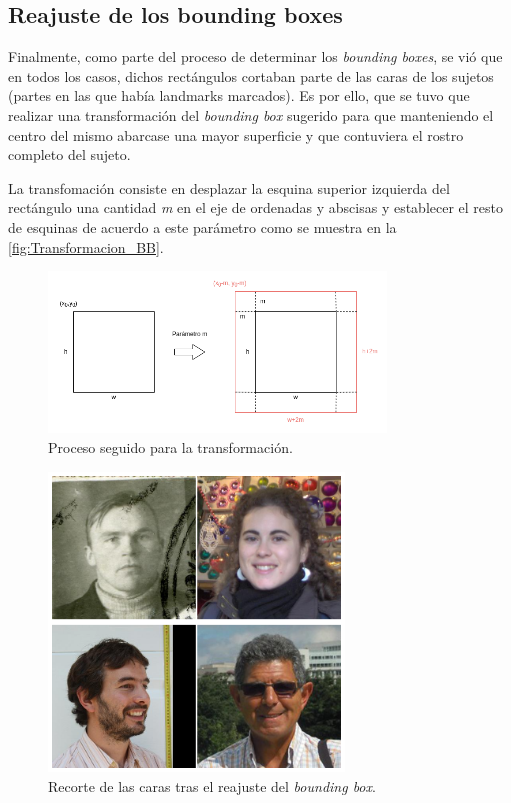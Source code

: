         \subsection{Reajuste de los bounding boxes}
            \noindent Finalmente, como parte del proceso de determinar los \textit{bounding boxes}, se vió que en todos los casos, dichos rectángulos cortaban parte de las caras de los sujetos (partes en las que había landmarks marcados). Es por ello, que se tuvo que realizar una transformación del \textit{bounding box} sugerido para que manteniendo el centro del mismo abarcase una mayor superficie y que contuviera el rostro completo del sujeto. 

            \medskip

            \noindent La transfomación consiste en desplazar la esquina superior izquierda del rectángulo una cantidad \textit{m} en el eje de ordenadas y abscisas y establecer el resto de esquinas de acuerdo a este parámetro como se muestra en la \autoref{fig:Transformacion_BB}.


            \begin{figure}[!h]
                \centering
                \includegraphics[width=0.8\textwidth]{img/Transformacion_rectangulo.png}
                \caption{Proceso seguido para la transformación.}
                \label{fig:Transformacion_BB}
            \end{figure}

            \begin{figure}[!h]
                \centering
                \includegraphics[width=0.7\textwidth]{img/imagenes_ejemplo_cropping.png}
                \caption{Recorte de las caras tras el reajuste del \textit{bounding box}.}
                \label{fig:Reajuste_bb}
            \end{figure}

